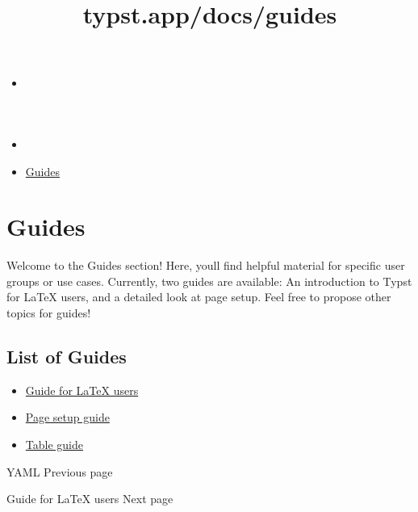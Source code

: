 \title{typst.app/docs/guides}

\begin{itemize}
\tightlist
\item
  \href{/docs}{}
\item
  
\item
  \href{/docs/guides/}{Guides}
\end{itemize}

\section{Guides}\label{guides}

Welcome to the Guides section! Here, you\textquotesingle ll find helpful
material for specific user groups or use cases. Currently, two guides
are available: An introduction to Typst for LaTeX users, and a detailed
look at page setup. Feel free to propose other topics for guides!

\subsection{List of Guides}\label{list-of-guides}

\begin{itemize}
\tightlist
\item
  \href{/docs/guides/guide-for-latex-users/}{Guide for LaTeX users}
\item
  \href{/docs/guides/page-setup-guide/}{Page setup guide}
\item
  \href{/docs/guides/table-guide/}{Table guide}
\end{itemize}

\href{/docs/reference/data-loading/yaml/}{\pandocbounded{}}

{ YAML } { Previous page }

\href{/docs/guides/guide-for-latex-users/}{\pandocbounded{}}

{ Guide for LaTeX users } { Next page }
